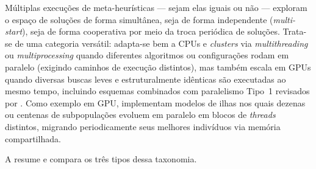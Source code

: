\begin{enumerate}
            Múltiplas execuções de meta-heurísticas --- sejam elas iguais ou não --- exploram o espaço de soluções de forma simultânea, seja de forma independente (\emph{multi-start}), seja de forma cooperativa por meio da troca periódica de soluções.
            Trata-se de uma categoria versátil: adapta-se bem a CPUs e \emph{clusters} via \emph{multithreading} ou \emph{multiprocessing} quando diferentes algoritmos ou configurações rodam em paralelo (exigindo caminhos de execução distintos), mas também escala em GPUs quando diversas buscas leves e estruturalmente idênticas são executadas ao mesmo tempo, incluindo esquemas combinados com paralelismo Tipo~1 revisados por \textcite{schulz2013gpu}.
            Como exemplo em GPU, \textcite{luong2013gpu} implementam modelos de ilhas nos quais dezenas ou centenas de subpopulações evoluem em paralelo em blocos de \emph{threads} distintos, migrando periodicamente seus melhores indivíduos via memória compartilhada.
\end{enumerate}

A  resume e compara os três tipos dessa taxonomia.

